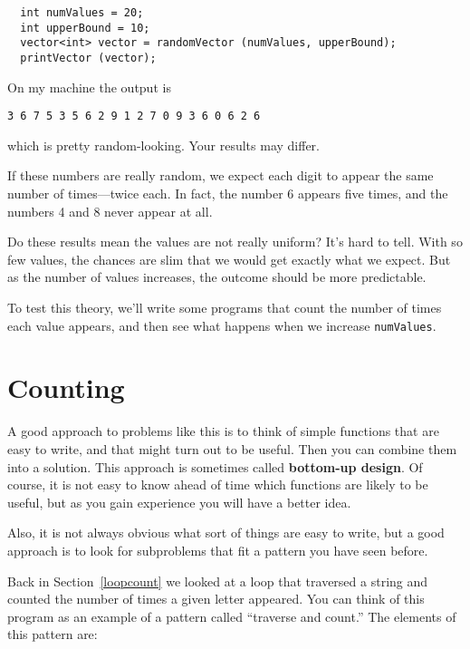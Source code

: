 \begin{verbatim}
  int numValues = 20;
  int upperBound = 10;
  vector<int> vector = randomVector (numValues, upperBound);
  printVector (vector);
\end{verbatim}
%
On my machine the output is

\begin{verbatim}
3 6 7 5 3 5 6 2 9 1 2 7 0 9 3 6 0 6 2 6 
\end{verbatim}
%
which is pretty random-looking.  Your results may differ.

If these numbers are really random,
we expect each digit to appear the same number of times---twice
each.  In fact, the number 6 appears five times, and the numbers 4
and 8 never appear at all.

Do these results mean the values are not really uniform?  It's
hard to tell.  With so few values, the chances are slim
that we would get exactly what we expect.  But as the number
of values increases, the outcome should be more predictable.

To test this theory, we'll write some programs that count the
number of times each value appears, and then see what happens
when we increase {\tt numValues}.

\section{Counting}
\label{counting}

A good approach to problems like this is to think of simple functions
that are easy to write, and that might turn out to be useful.  Then
you can combine them into a solution.  This approach is sometimes
called {\bf bottom-up design}.  Of course, it is not easy to
know ahead of time which functions are likely to be useful, but as you
gain experience you will have a better idea.


Also, it is not always obvious what sort of things are easy to write,
but a good approach is to look for subproblems that fit a pattern you
have seen before.


Back in Section~\ref{loopcount} we looked at a loop that traversed a
string and counted the number of times a given letter appeared.  You
can think of this program as an example of a pattern called ``traverse
and count.''  The elements of this pattern are:

